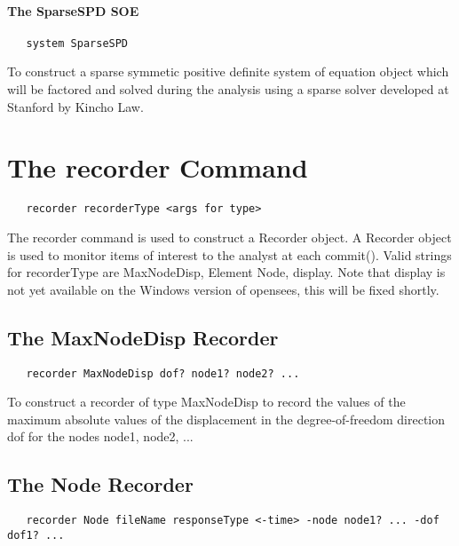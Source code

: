 \documentclass[12pt]{article}
\begin{document}
\paragraph{The SparseSPD SOE}

{\sf\small
\begin{verbatim}
   system SparseSPD
\end{verbatim}
}

\noindent To construct a sparse symmetic positive definite system of
equation object which will be factored and solved during the analysis
using a sparse solver developed at Stanford by Kincho Law.

\section {The recorder Command}

{\sf\small
\begin{verbatim}
   recorder recorderType <args for type>
\end{verbatim}
}

The recorder command is used to construct a Recorder object. A
Recorder object is used to monitor items of interest to the analyst at
each commit(). Valid strings for recorderType are MaxNodeDisp, Element
Node, display. Note that display is not yet available on the
Windows version of opensees, this will be fixed shortly.

\subsection{The MaxNodeDisp Recorder}

{\sf\small
\begin{verbatim}
   recorder MaxNodeDisp dof? node1? node2? ...
\end{verbatim}
}

\noindent To construct a recorder of type MaxNodeDisp to record the values of
the maximum absolute values of the displacement in the
degree-of-freedom direction dof for the nodes node1, node2, ...

\subsection{The Node Recorder}

{\sf\small
\begin{verbatim}
   recorder Node fileName responseType <-time> -node node1? ... -dof dof1? ...
\end{verbatim}
}
\end{document}
